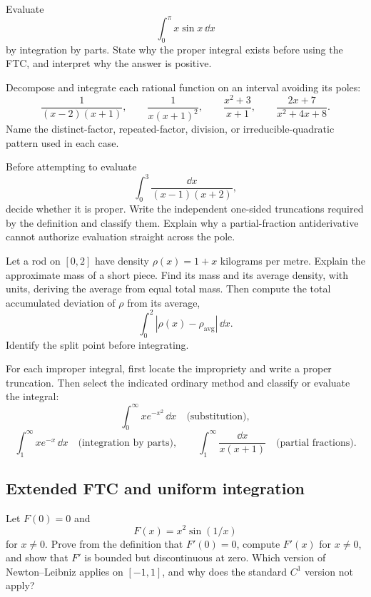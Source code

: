 \begin{exercise}
Evaluate
\[
\int_0^\pi x\sin x\,\dd x
\]
by integration by parts. State why the proper integral exists before using
the FTC, and interpret why the answer is positive.
\end{exercise}

\begin{exercise}
Decompose and integrate each rational function on an interval avoiding its
poles:
\[
\frac{1}{(x-2)(x+1)},
\qquad
\frac{1}{x(x+1)^2},
\qquad
\frac{x^2+3}{x+1},
\qquad
\frac{2x+7}{x^2+4x+8}.
\]
Name the distinct-factor, repeated-factor, division, or irreducible-quadratic
pattern used in each case.
\end{exercise}

\begin{exercise}
Before attempting to evaluate
\[
\int_0^3\frac{\dd x}{(x-1)(x+2)},
\]
decide whether it is proper. Write the independent one-sided truncations
required by the definition and classify them. Explain why a partial-fraction
antiderivative cannot authorize evaluation straight across the pole.
\end{exercise}

\begin{exercise}
Let a rod on \([0,2]\) have density \(\rho(x)=1+x\) kilograms per metre.
Explain the approximate mass of a short piece. Find its mass and its average
density, with units, deriving the average from equal total mass. Then compute the total
accumulated deviation of \(\rho\) from its average,
\[
\int_0^2|\rho(x)-\rho_{\mathrm{avg}}|\,\dd x.
\]
Identify the split point before integrating.
\end{exercise}

\begin{exercise}
For each improper integral, first locate the impropriety and write a proper
truncation. Then select the indicated ordinary method and classify or
evaluate the integral:
\[
\int_0^\infty xe^{-x^2}\,\dd x
\quad\text{(substitution)},
\]
\[
\int_1^\infty xe^{-x}\,\dd x
\quad\text{(integration by parts)},
\qquad
\int_1^\infty\frac{\dd x}{x(x+1)}
\quad\text{(partial fractions)}.
\]
\end{exercise}

\subsection*{Extended FTC and uniform integration}

\begin{exercise}
Let \(F(0)=0\) and
\[
F(x)=x^2\sin(1/x)
\]
 for \(x\ne0\). Prove from the
definition that \(F'(0)=0\), compute \(F'(x)\) for \(x\ne0\), and show that
\(F'\) is bounded but discontinuous at zero. Which version of
Newton--Leibniz applies on \([-1,1]\), and why does the standard \(C^1\)
version not apply?
\end{exercise}

